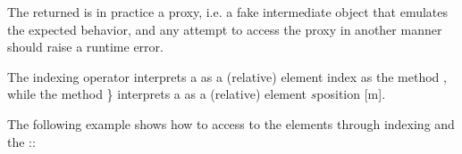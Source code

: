 \documentclass[letterpaper,10pt,english]{sphinxmanual}
\begin{document}
\sphinxAtStartPar
The returned  is in practice a proxy, i.e. a fake intermediate object that emulates the expected behavior, and any attempt to access the proxy in
another manner should raise a runtime error.

\sphinxAtStartPar
{} The indexing operator \sphinxcode{\sphinxupquote{{[}{]}}} interprets a  as a (relative) element index as the method , while the method \} interprets a
 as a (relative) element \(s\)\sphinxhyphen{}position {[}m{]}.

\sphinxAtStartPar
The following example shows how to access to the elements through indexing and the ::
\end{document}
